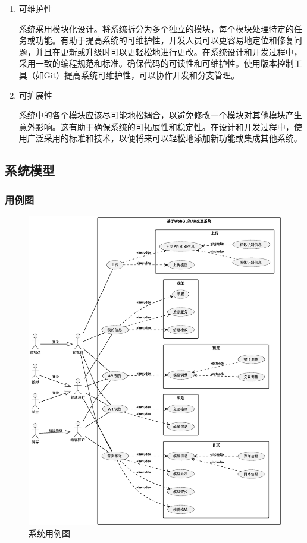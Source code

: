 \begin{enumerate}
  \item 可维护性
  
  系统采用模块化设计。将系统拆分为多个独立的模块，每个模块处理特定的任务或功能。有助于提高系统的可维护性，开发人员可以更容易地定位和修复问题，并且在更新或升级时可以更轻松地进行更改。在系统设计和开发过程中，采用一致的编程规范和标准。确保代码的可读性和可维护性。使用版本控制工具（如Git）提高系统可维护性，可以协作开发和分支管理。

  \item 可扩展性
  
  系统中的各个模块应该尽可能地松耦合，以避免修改一个模块对其他模块产生意外影响。这有助于确保系统的可拓展性和稳定性。在设计和开发过程中，使用广泛采用的标准和技术，以便将来可以轻松地添加新功能或集成其他系统。
\end{enumerate}

\subsection{系统模型}

\subsubsection{用例图} 

\begin{figure}[H]
  \small
  \centering
  \includegraphics[width=\textwidth]{./figs/UserCase.eps}
  \caption{系统用例图}
  \label{fig:系统用例图}
\end{figure}

